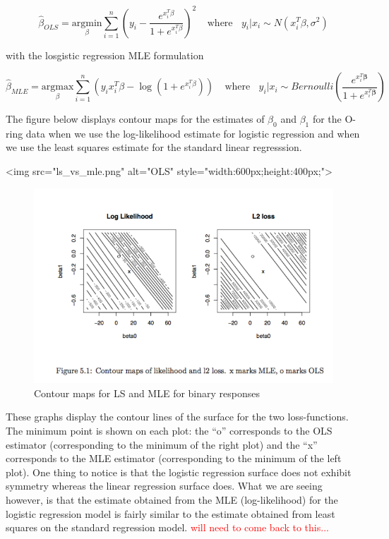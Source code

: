 $$\hat{\beta}_{OLS} = \underset{\beta}{\text{argmin}} \sum_{i=1}^n \left(y_i -  \frac{e^{x_i^T \beta}}{1 + e^{x_i^T \beta}}\right)^2 ~~~~~ \text{where} ~~~~ y_i | x_i \sim N(x_i^T\beta, \sigma^2)$$

with the losgistic regression MLE formulation

$$\hat{\beta}_{MLE} = \underset{\beta}{\text{argmax}}\sum_{i=1}^n \left( y_i x_i^T \beta - \log \left( 1 + e^{x_i^T \beta} \right) \right) ~~~~~ \text{where} ~~~~ y_i | x_i \sim Bernoulli\left(\frac{e^{x_i^T \boldsymbol{\beta}} }{1 + e^{x_i^T \boldsymbol{\beta}}}\right)$$


The figure below displays contour maps for the estimates of $\beta_0$ and $\beta_1$ for the O-ring data when we use the log-likelihood estimate for logistic regression and when we use the least squares estimate for the standard linear regresssion. 


<img src="ls_vs_mle.png" alt="OLS" style="width:600px;height:400px;">


\begin{figure}[H]
\begin{center}
\includegraphics[scale=0.8]{ls_vs_mle.png}
\end{center}
\caption{Contour maps for LS and MLE for binary responses}
\label{fig:ls_vs_mle}
\end{figure}

These graphs display the contour lines of the surface for the two loss-functions. The minimum point is shown on each plot: the ``o'' corresponds to the OLS estimator (corresponding to the minimum of the right plot) and the ``x'' corresponds to the MLE estimator (corresponding to the minimum of the left plot). One thing to notice is that the logistic regression surface does not exhibit symmetry whereas the linear regression surface does. What we are seeing however, is that the estimate obtained from the MLE (log-likelihood) for the logistic regression model is fairly similar to the estimate obtained from least squares on the standard regression model. \textcolor{red}{will need to come back to this...}





